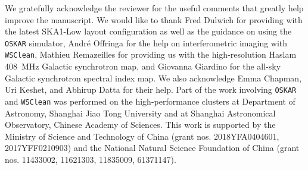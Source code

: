\documentclass[twocolumn]{aastex62}
\newcommand{\editone}[1]{{\leavevmode\color{cyan}#1}}
\begin{document}
\acknowledgments

\editone{We gratefully acknowledge the reviewer for the useful comments
that greatly help improve the manuscript.}
We would like to thank
Fred Dulwich for providing with the latest SKA1-Low layout configuration
as well as the guidance on using the \texttt{OSKAR} simulator,
Andr\'e Offringa for the help on interferometric imaging with
\texttt{WSClean},
Mathieu Remazeilles for providing us with the high-resolution Haslam
\SI{408}{\MHz} Galactic synchrotron map,
and Giovanna Giardino for the all-sky Galactic synchrotron spectral
index map.
We also acknowledge Emma Chapman, Uri Keshet, and Abhirup Datta for
their help.
Part of the work involving \texttt{OSKAR} and \texttt{WSClean} was
performed on the high-performance clusters
at Department of Astronomy, Shanghai Jiao Tong University and
at Shanghai Astronomical Observatory, Chinese Academy of Sciences.
This work is supported by
the Ministry of Science and Technology of China
(grant nos\@. 2018YFA0404601, 2017YFF0210903)
and the National Natural Science Foundation of China
(grant nos\@. 11433002, 11621303, 11835009, 61371147).


%

\vspace{5mm}


\end{document}
